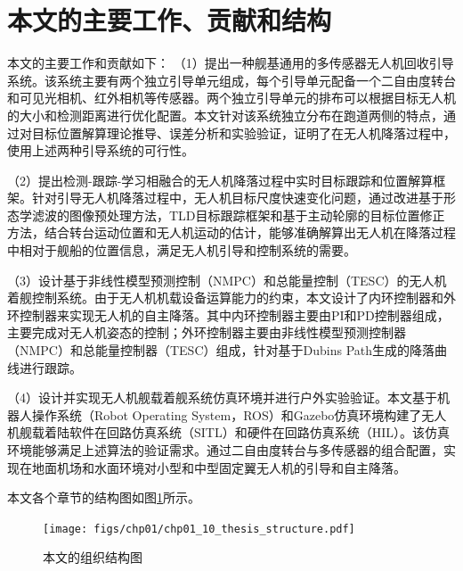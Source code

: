 \section{本文的主要工作、贡献和结构}
本文的主要工作和贡献如下：
（1）提出一种舰基通用的多传感器无人机回收引导系统。该系统主要有两个独立引导单元组成，每个引导单元配备一个二自由度转台和可见光相机、红外相机等传感器。两个独立引导单元的排布可以根据目标无人机的大小和检测距离进行优化配置。本文针对该系统独立分布在跑道两侧的特点，通过对目标位置解算理论推导、误差分析和实验验证，证明了在无人机降落过程中，使用上述两种引导系统的可行性。

（2）提出检测-跟踪-学习相融合的无人机降落过程中实时目标跟踪和位置解算框架。针对引导无人机降落过程中，无人机目标尺度快速变化问题，通过改进基于形态学滤波的图像预处理方法，TLD目标跟踪框架和基于主动轮廓的目标位置修正方法，结合转台运动位置和无人机运动的估计，能够准确解算出无人机在降落过程中相对于舰船的位置信息，满足无人机引导和控制系统的需要。

（3）设计基于非线性模型预测控制（NMPC）和总能量控制（TESC）的无人机着舰控制系统。由于无人机机载设备运算能力的约束，本文设计了内环控制器和外环控制器来实现无人机的自主降落。其中内环控制器主要由PI和PD控制器组成，主要完成对无人机姿态的控制；外环控制器主要由非线性模型预测控制器（NMPC）和总能量控制器（TESC）组成，针对基于Dubins Path生成的降落曲线进行跟踪。

（4）设计并实现无人机舰载着舰系统仿真环境并进行户外实验验证。本文基于机器人操作系统（Robot Operating System，ROS）和Gazebo仿真环境构建了无人机舰载着陆软件在回路仿真系统（SITL）和硬件在回路仿真系统（HIL）。该仿真环境能够满足上述算法的验证需求。通过二自由度转台与多传感器的组合配置，实现在地面机场和水面环境对小型和中型固定翼无人机的引导和自主降落。

本文各个章节的结构图如图\ref{fig:chp01_10_thesis_structure}所示。
\begin{figure}[!h]   
	\centering	
	\texttt{[image: figs/chp01/chp01\_10\_thesis\_structure.pdf]}
	\caption{本文的组织结构图}
	\label{fig:chp01_10_thesis_structure}
\end{figure}
